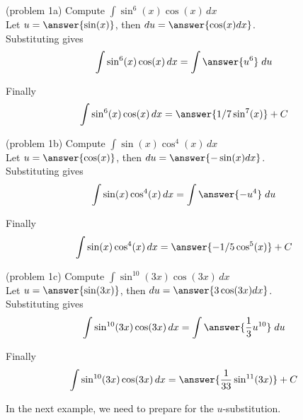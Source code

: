 \documentclass[handout]{ximera}
\begin{document}
\begin{problem}(problem 1a) 
Compute $\displaystyle{\int \sin^6(x)\cos(x) \, dx}$\\

Let $u = \answer{\sin(x)}$, \; then $du = \answer{\cos(x) dx}$.\\

Substituting gives
\[
\int \sin^6(x)\cos(x) \, dx = \int \answer{u^6} \; du
\]

Finally
\[
\int \sin^{6}(x)\cos(x) \, dx = \answer{1/7 \sin^7(x)} + C
\]

\end{problem}



\begin{problem}(problem 1b) 
Compute $\displaystyle{\int \sin(x)\cos^4(x) \, dx}$\\

Let $u = \answer{\cos(x)}$, \; then $du = \answer{-\sin(x) dx}$.\\

Substituting gives 
\[
\int \sin(x)\cos^4(x) \, dx = \int \answer{-u^4} \; du
\]

Finally 
\[
\int \sin(x)\cos^4(x) \, dx = \answer{-1/5 \cos^5(x)} + C
\]

\end{problem}



\begin{problem}(problem 1c)
Compute $\displaystyle{\int \sin^{10}(3x)\cos(3x) \, dx}$\\

Let $u = \answer{\sin(3x)}$, \; then $du = \answer{3\cos(3x) dx}$.\\

Substituting gives 
\[
\int \sin^{10}(3x)\cos(3x) \, dx = \int \answer{\frac13 u^{10}} \; du
\]

Finally
\[
\int \sin^{10}(3x)\cos(3x) \, dx = \answer{\frac{1}{33} \sin^{11}(3x)} + C
\]

\end{problem}



In the next example, we need to prepare for the $u$-substitution. 
\end{document}
